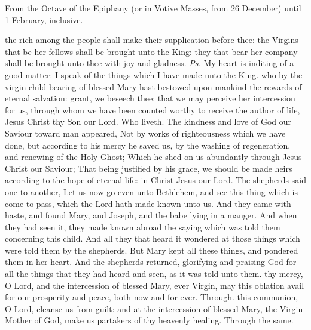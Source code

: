 \begin{rubric}
    {From the Octave of the Epiphany (or in Votive Masses, from 26 December) until 1 February, inclusive.}
\end{rubric}
\introit
{} the rich among the people shall make their supplication before thee: the Virgins that be her fellows shall be brought unto the King: they that bear her company shall be brought unto thee with joy and gladness. \textit{Ps.} My heart is inditing of a good matter: I speak of the things which I have made unto the King.
\collect
{} who by the virgin child-bearing of blessed Mary hast bestowed upon mankind the rewards of eternal salvation: grant, we beseech thee; that we may perceive her intercession for us, through whom we have been counted worthy to receive the author of life, Jesus Christ thy Son our Lord. Who liveth.
 The kindness and love of God our Saviour toward man appeared, Not by works of righteousness which we have done, but according to his mercy he saved us, by the washing of regeneration, and renewing of the Holy Ghost; Which he shed on us abundantly through Jesus Christ our Saviour; That being justified by his grace, we should be made heirs according to the hope of eternal life:
in Christ Jesus our Lord.
 The shepherds said one to another, Let us now go even unto Bethlehem, and see this thing which is come to pass, which the Lord hath made known unto us. And they came with haste, and found Mary, and Joseph, and the babe lying in a manger. And when they had seen it, they made known abroad the saying which was told them concerning this child. And all they that heard it wondered at those things which were told them by the shepherds. But Mary kept all these things, and pondered them in her heart. And the shepherds returned, glorifying and praising God for all the things that they had heard and seen, as it was told unto them.
\secret
{} thy mercy, O Lord, and the intercession of blessed Mary, ever Virgin, may this oblation avail for our prosperity and peace, both now and for ever. Through.
\postcommunion
{} this communion, O Lord, cleanse us from guilt: and at the intercession of blessed Mary, the Virgin Mother of God, make us partakers of thy heavenly healing. Through the same.


